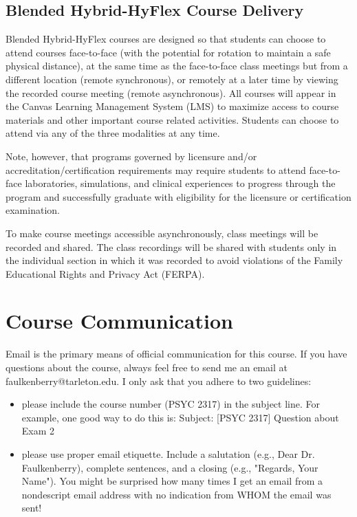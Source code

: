 \documentclass[10pt]{article}
\begin{document}
\subsection*{Blended Hybrid-HyFlex Course Delivery}
\label{sec:org53a1126}
Blended Hybrid-HyFlex courses are designed so that students can choose to attend courses face-to-face (with the potential for rotation to maintain a safe physical distance), at the same time as the face-to-face class meetings but from a different location (remote synchronous), or remotely at a later time by viewing the recorded course meeting (remote asynchronous). All courses will appear in the Canvas Learning Management System (LMS) to maximize access to course materials and other important course related activities. Students can choose to attend via any of the three modalities at any time.

Note, however, that programs governed by licensure and/or accreditation/certification requirements may require students to attend face-to-face laboratories, simulations, and clinical experiences to progress through the program and successfully graduate with eligibility for the licensure or certification examination.

To make course meetings accessible asynchronously, class meetings will be recorded and shared. The class recordings will be shared with students only in the individual section in which it was recorded to avoid violations of the Family Educational Rights and Privacy Act (FERPA).

\section*{Course Communication}
\label{sec:org6fc503a}

Email is the primary means of official communication for this course.  If you have questions about the course, always feel free to send me an email at faulkenberry@tarleton.edu.  I only ask that you adhere to two guidelines:
\begin{itemize}
\item please include the course number (PSYC 2317) in the subject line.  For example, one good way to do this is:  Subject: [PSYC 2317] Question about Exam 2
\item please use proper email etiquette.  Include a salutation (e.g., Dear Dr. Faulkenberry), complete sentences, and a closing (e.g., "Regards, Your Name").  You might be surprised how many times I get an email from a nondescript email address with no indication from WHOM the email was sent!
\end{itemize}
\end{document}
